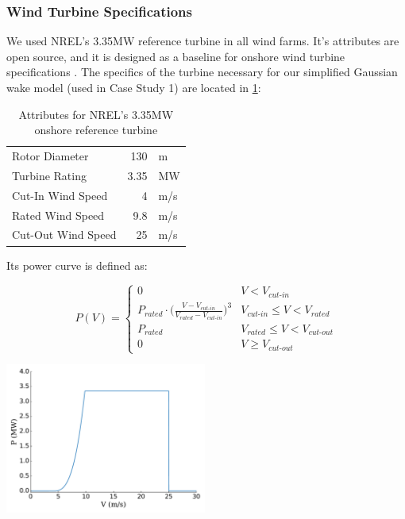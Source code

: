 \subsubsection{Wind Turbine Specifications} \label{sec:turb}
	We used NREL's 3.35MW reference turbine in all wind farms.
	It's attributes are open source, and it is designed as a baseline for onshore wind turbine specifications \cite{NREL335MW}.
	The specifics of the turbine necessary for our simplified Gaussian wake model (used in Case Study 1) are located in \cref{tab:335MW}:

	\begin{table}
		\begin{center}
			\caption{Attributes for NREL's 3.35MW onshore reference turbine}
			\label{tab:335MW}
			\begin{tabular}{@{}lrl@{}}
			\toprule
				Rotor Diameter & 130 & m \\ 
				Turbine Rating & 3.35 & MW \\ 
				Cut-In Wind Speed & 4 & m/s \\ 
				Rated Wind Speed & 9.8 & m/s \\ 
				Cut-Out Wind Speed & 25 & m/s \\
			\bottomrule
			\end{tabular}
		\end{center}
	\end{table}
		
	\noindent Its power curve is defined as:   

	\begin{minipage}{0.53\textwidth}
		\begin{equation*}
			P(V) = 
			\begin{cases} 
				0 & V < V_{\textit{cut-in}} \\
				P_{\textit{rated}}\cdot\bigg(\frac{V-V_{\textit{cut-in}}}{V_{\textit{rated}}-V_{\textit{cut-in}}}\bigg)^3 & V_{\textit{cut-in}}\leq V < V_{\textit{rated}} \\
				P_{\textit{rated}} & V_{\textit{rated}} \leq V < V_{\textit{cut-out}} \\
				0 & V \geq V_{\textit{cut-out}}
			\end{cases}
		\label{eq:power}
		\end{equation*}
	\end{minipage}\quad
	\begin{minipage}{0.53\textwidth}
		\includegraphics[width=2.6in]{./figures/iea37-335mw-pcurve.pdf}
	\end{minipage}


